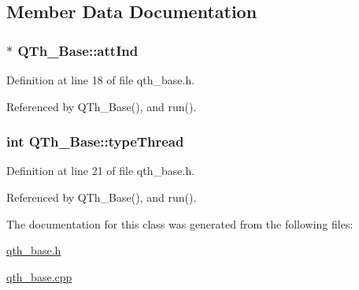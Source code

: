 \subsection{Member Data Documentation}
\hypertarget{classQTh__Base_a51fa634be0cdd712417ee2f97919acc7}{
\subsubsection[{att\-Ind}]{$\ast$ Q\-Th\-\_\-\-Base\-::att\-Ind}}\label{classQTh__Base_a51fa634be0cdd712417ee2f97919acc7}


Definition at line 18 of file qth\-\_\-base.\-h.



Referenced by Q\-Th\-\_\-\-Base(), and run().

\hypertarget{classQTh__Base_acc21cc2cc7304e83231c9f305874499f}{
\subsubsection[{type\-Thread}]{\setlength{\rightskip}{0pt plus 5cm}int Q\-Th\-\_\-\-Base\-::type\-Thread\hspace{0.3cm}{\ttfamily [private]}}}\label{classQTh__Base_acc21cc2cc7304e83231c9f305874499f}


Definition at line 21 of file qth\-\_\-base.\-h.



Referenced by Q\-Th\-\_\-\-Base(), and run().



The documentation for this class was generated from the following files\-:\begin{DoxyCompactItemize}
\item 
\hyperlink{qth__base_8h}{qth\-\_\-base.\-h}\item 
\hyperlink{qth__base_8cpp}{qth\-\_\-base.\-cpp}\end{DoxyCompactItemize}
